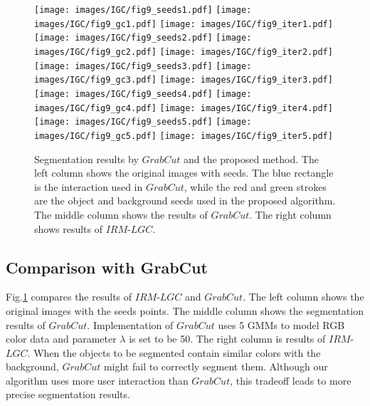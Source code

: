          \begin{figure}[htp]
        \centering
        {{\texttt{[image: images/IGC/fig9\_seeds1.pdf]}}
        {\texttt{[image: images/IGC/fig9\_gc1.pdf]}}
        {\texttt{[image: images/IGC/fig9\_iter1.pdf]}}
        {\texttt{[image: images/IGC/fig9\_seeds2.pdf]}}
        {\texttt{[image: images/IGC/fig9\_gc2.pdf]}}
        {\texttt{[image: images/IGC/fig9\_iter2.pdf]}}
        {\texttt{[image: images/IGC/fig9\_seeds3.pdf]}}
        {\texttt{[image: images/IGC/fig9\_gc3.pdf]}}
        {\texttt{[image: images/IGC/fig9\_iter3.pdf]}}
        {\texttt{[image: images/IGC/fig9\_seeds4.pdf]}}
        {\texttt{[image: images/IGC/fig9\_gc4.pdf]}}
        {\texttt{[image: images/IGC/fig9\_iter4.pdf]}}
        {\texttt{[image: images/IGC/fig9\_seeds5.pdf]}}
        {\texttt{[image: images/IGC/fig9\_gc5.pdf]}}
        {\texttt{[image: images/IGC/fig9\_iter5.pdf]}}
        }
        \caption{Segmentation results by $GrabCut$ and the proposed method. The left column shows the original images with seeds. The blue rectangle is the interaction used in $GrabCut$, while the red and green strokes are the object and background seeds used in the proposed algorithm. The middle column shows the results of $GrabCut$. The right column shows results of $IRM$-$LGC$. }
        \label{IGC:fig:segment3}
        \end{figure}

\subsection{Comparison with GrabCut} \label{IGC:experiment:grabcut}
Fig.\ref{IGC:fig:segment3} compares the results of $IRM$-$LGC$ and $GrabCut$. The left column shows the original images with the seeds points. The middle column shows the segmentation results of $GrabCut$. Implementation of $GrabCut$ uses 5 GMMs to model RGB color data and parameter $\lambda$ is set to be 50. The right column is results of $IRM$-$LGC$. When the objects to be segmented contain similar colors with the background, $GrabCut$ might fail to correctly segment them. Although our algorithm uses more user
interaction than $GrabCut$, this tradeoff leads to more precise segmentation results.

